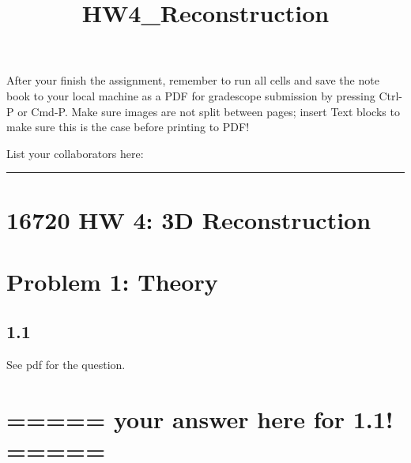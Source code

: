 \documentclass[11pt]{article}
\title{HW4\_Reconstruction}
\begin{document}
    
    \maketitle
    
    

    
    After your finish the assignment, remember to run all cells and save the
note book to your local machine as a PDF for gradescope submission by
pressing Ctrl-P or Cmd-P. Make sure images are not split between pages;
insert Text blocks to make sure this is the case before printing to PDF!

    List your collaborators here:

\begin{center}\rule{0.5\linewidth}{0.5pt}\end{center}

    \hypertarget{hw-4-3d-reconstruction}{%
\section{\texorpdfstring{\textbf{16720 HW 4: 3D
Reconstruction}}{16720 HW 4: 3D Reconstruction}}\label{hw-4-3d-reconstruction}}

\hypertarget{problem-1-theory}{%
\section{Problem 1: Theory}\label{problem-1-theory}}

    \hypertarget{section}{%
\subsection{1.1}\label{section}}

See pdf for the question.

    \hypertarget{your-answer-here-for-1.1}{%
\section{===== your answer here for 1.1!
=====}\label{your-answer-here-for-1.1}}
\end{document}
